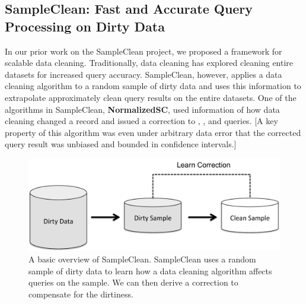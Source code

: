 \subsection{SampleClean: Fast and Accurate Query Processing on Dirty Data}


In our prior work on the SampleClean project, we proposed a framework for scalable data cleaning.
Traditionally, data cleaning has explored cleaning entire datasets for increased query accuracy. 
SampleClean, however, applies a data cleaning algorithm to a random sample of dirty data and uses this information to extrapolate approximately clean query results on the entire datasets. 
One of the algorithms  in SampleClean,  \textbf{NormalizedSC}, used information of how data cleaning changed a record and issued a correction to \sumfunc, \avgfunc, and \countfunc queries.  
[A key property of this algorithm was even under arbitrary data error that the corrected query result was unbiased and bounded in confidence intervals.] 

\begin{figure}[t] \vspace{-2em}
\centering
 \includegraphics[scale=0.30]{figs/sys-arch2.pdf} \vspace{-.25em}
 \caption{A basic overview of SampleClean. SampleClean uses a random sample of dirty data to learn how a data cleaning algorithm affects queries on the sample. We can then derive a correction to compensate for the dirtiness. }\vspace{-1.75em}
\end{figure}


